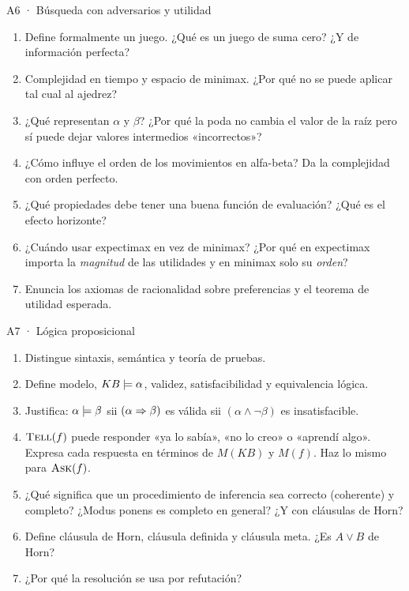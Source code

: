 \begin{ejercicio}{A6 · Búsqueda con adversarios y utilidad }
\begin{enumerate}[label=\textbf{\arabic*.}]
\item Define formalmente un juego. ¿Qué es un juego de suma cero? ¿Y de información perfecta?
\item Complejidad en tiempo y espacio de minimax. ¿Por qué no se puede aplicar tal cual al ajedrez?
\item ¿Qué representan $\alpha$ y $\beta$? ¿Por qué la poda no cambia el valor de la raíz pero sí
puede dejar valores intermedios «incorrectos»?
\item ¿Cómo influye el orden de los movimientos en alfa-beta? Da la complejidad con orden perfecto.
\item ¿Qué propiedades debe tener una buena función de evaluación? ¿Qué es el efecto horizonte?
\item ¿Cuándo usar expectimax en vez de minimax? ¿Por qué en expectimax importa la
\emph{magnitud} de las utilidades y en minimax solo su \emph{orden}?
\item Enuncia los axiomas de racionalidad sobre preferencias y el teorema de utilidad esperada.
\end{enumerate}
\end{ejercicio}

\begin{ejercicio}{A7 · Lógica proposicional }
\begin{enumerate}[label=\textbf{\arabic*.}]
\item Distingue sintaxis, semántica y teoría de pruebas.
\item Define modelo, $KB\models\alpha$, validez, satisfacibilidad y equivalencia lógica.
\item Justifica: $\alpha\models\beta$ sii $(\alpha\Rightarrow\beta)$ es válida sii $(\alpha\wedge\neg\beta)$ es insatisfacible.
\item $\textsc{Tell}(f)$ puede responder «ya lo sabía», «no lo creo» o «aprendí algo». Expresa cada
respuesta en términos de $M(KB)$ y $M(f)$. Haz lo mismo para $\textsc{Ask}(f)$.
\item ¿Qué significa que un procedimiento de inferencia sea correcto (coherente) y completo?
¿Modus ponens es completo en general? ¿Y con cláusulas de Horn?
\item Define cláusula de Horn, cláusula definida y cláusula meta. ¿Es $A\vee B$ de Horn?
\item ¿Por qué la resolución se usa por refutación?
\end{enumerate}
\end{ejercicio}

